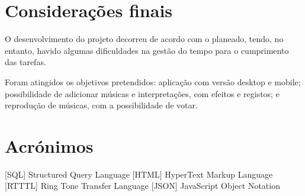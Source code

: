 \documentclass{report}
\begin{document}
\chapter{Considerações finais}
\label{chap.finais}

O desenvolvimento do projeto decorreu de acordo com o planeado, tendo, no entanto, havido algumas dificuldades na gestão do tempo para o cumprimento das tarefas.

Foram atingidos os objetivos pretendidos: aplicação com versão desktop e mobile; possibilidade de adicionar músicas e interpretações, com efeitos e registos; e reprodução de músicas, com a possibilidade de votar.


\chapter*{Acrónimos}
\begin{acronym}
[SQL] {Structured Query Language}
 [HTML] {HyperText Markup Language}
 [RTTTL] {Ring Tone Transfer Language}
 [JSON] {JavaScript Object Notation}

\end{acronym}


\printbibliography
\end{document}
